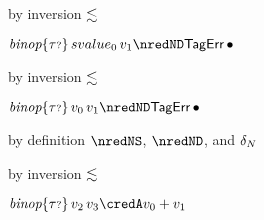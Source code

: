{\begin{lamportproof*}
    \begin{pfproof}
        \begin{pfproof}
            \begin{pfproof}
              by inversion $\lesssim$
            \end{pfproof}
          \qedstep
            \begin{pfproof}
              $\ebinopt{\stoptional}{svalue_0}{\svalue_1} \nredND \tagerrorD$
            \end{pfproof}
        \end{pfproof}
        \begin{pfproof}
            \begin{pfproof}
              by inversion $\lesssim$
            \end{pfproof}
          \qedstep
            \begin{pfproof}
              $\ebinopt{\stoptional}{\svalue_0}{\svalue_1} \nredND \tagerrorD$
            \end{pfproof}
        \end{pfproof}
    \end{pfproof}

    \begin{pfproof}
        \begin{pfproof}
          by definition $\nredNS$, $\nredND$, and $\delta_{N}$
        \end{pfproof}
        \begin{pfproof}
          by inversion $\lesssim$
        \end{pfproof}
      \qedstep
        \begin{pfproof}
          $\ebinopt{\stoptional}{\svalue_2}{\svalue_3} \credA \svalue_0 + \svalue_1$
        \end{pfproof}
    \end{pfproof}


\end{lamportproof*}}
